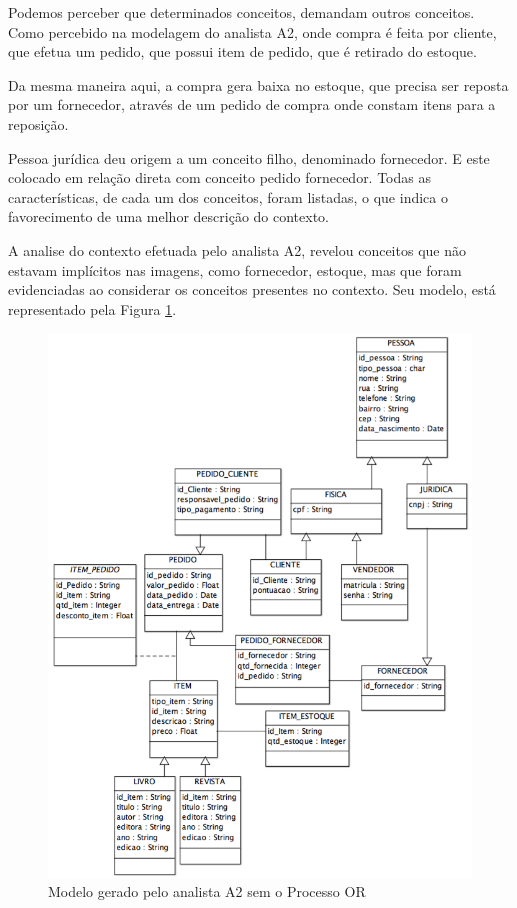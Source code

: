 Podemos perceber que determinados conceitos, demandam outros conceitos. Como percebido na modelagem do analista A2, onde compra é feita por cliente, que efetua um pedido, que possui item de pedido, que é retirado do estoque.

Da mesma maneira aqui, a compra gera baixa no estoque, que precisa ser reposta por um fornecedor, através de um pedido de compra onde constam itens para a reposição.

Pessoa jurídica deu origem a um conceito filho, denominado fornecedor. E este colocado em relação direta com conceito pedido fornecedor. Todas as características, de cada um dos conceitos, foram listadas, o que indica o favorecimento de uma melhor descrição do contexto.

A analise do contexto efetuada pelo analista A2, revelou conceitos que não estavam implícitos nas imagens, como fornecedor, estoque, mas que foram evidenciadas ao considerar os conceitos presentes no contexto. Seu modelo, está representado pela Figura \ref{fig:modeloA2001}.

\begin{figure}[!ht]
    \centering
    \includegraphics[width=\textwidth]{imagens/Modelo_001_Vanessa_Sales.png}
    \caption{Modelo gerado pelo analista A2 sem o Processo OR}
    \label{fig:modeloA2001}
\end{figure}

